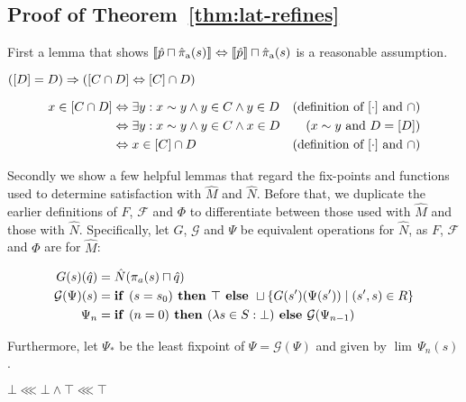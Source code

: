 \subsection{Proof of Theorem~\ref{thm:lat-refines}}

First a lemma that shows $\llbracket \hat p \sqcap \operatorname{\hat{\pi}_{\textrm{a}}}(s) \rrbracket \Leftrightarrow \llbracket \hat p \rrbracket \sqcap \operatorname{\hat{\pi}_{\textrm{a}}}(s)$ is a reasonable assumption.

\begin{lemma}
$([D] = D) \Rightarrow ([C \cap D] \Leftrightarrow [C] \cap D)$
\end{lemma}
%
\begin{align*}
x \in [C \cap D] & \Leftrightarrow \exists y : x \sim y \wedge y \in C \wedge y \in D & (\textrm{definition of } [\cdot] \textrm{ and } \cap) \\
                     & \Leftrightarrow \exists y : x \sim y \wedge y \in C \wedge x \in D & (x \sim y \textrm{ and } D = [D]) \\
                     & \Leftrightarrow x \in [C] \cap D                               & (\textrm{definition of } [\cdot] \textrm { and } \cap)
\end{align*}

Secondly we show a few helpful lemmas that regard the fix-points and functions used to determine satisfaction with $\hat M$ and $\hat N$. Before that, we duplicate the earlier definitions of $F$, $\mathcal{F}$ and $\Phi$ to differentiate between those used with $\hat M$ and those with $\hat N$. Specifically, let $G$, $\mathcal{G}$ and $\Psi$ be equivalent operations for $\hat N$, as $F$, $\mathcal{F}$ and $\Phi$ are for $\hat M$:

\begin{align*}
G(s)(\hat q) &= \hat N(\pi_{a}(s) \sqcap \hat q) \\
\mathcal{G}(\Psi)(s) &= \textrm{\textbf{if }} (s = s_{0}) \textrm{\textbf{ then }} \top \textrm{\textbf{ else }} \sqcup \{ G(s')(\Psi(s')) \mid (s',s) \in R \} \\
\Psi_{n} &= \textrm{\textbf{if }} (n = 0) \textrm{\textbf{ then }} (\lambda s \in S : \bot) \textrm{\textbf{ else }} \mathcal{G}(\Psi_{n-1}) \\
\end{align*}

\noindent Furthermore, let $\Psi_{*}$ be the least fixpoint of $\Psi = \mathcal{G}(\Psi)$ and given by $\lim \, \Psi_{n}(s)$.

\begin{lemma} \label{lem:bot-refine-bot}
$\bot \lll \bot \wedge \top \lll \top$
\end{lemma}

